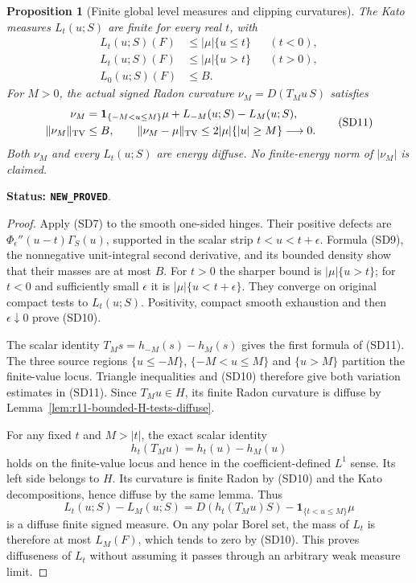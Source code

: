 \documentclass[11pt,a4paper]{article}
\numberwithin{equation}{section}
\newtheorem{proposition}[theorem]{Proposition}
\theoremstyle{definition}
\theoremstyle{remark}
\begin{document}
\begin{proposition}[Finite global level measures and clipping curvatures]
\label{prop:r11-signed-global-curvature-truncation}
The Kato measures $L_t(u;S)$ are finite for every real $t$,
with
\[
 \begin{aligned}
 L_t(u;S)(F)&\le |\mu|\{u\le t\}&& (t<0),\\
 L_t(u;S)(F)&\le |\mu|\{u>t\}&& (t>0),\\
 L_0(u;S)(F)&\le B.
 \end{aligned}
 \tag{SD10}
\]
For $M>0$, the actual signed Radon curvature
$\nu_M=D(T_Mu\,S)$ satisfies
\[
 \begin{split}
 \nu_M&=\mathbf1_{\{-M<u\le M\}}\mu+L_{-M}(u;S)-L_M(u;S),\\
 \|\nu_M\|_{\rm TV}&\le B,\qquad
 \|\nu_M-\mu\|_{\rm TV}
                    \le2|\mu|\{|u|\ge M\}\longrightarrow0.
 \end{split}
 \tag{SD11}
\]
Both $\nu_M$ and every $L_t(u;S)$ are energy diffuse.
No finite-energy norm of $|\nu_M|$ is claimed.
\end{proposition}

\noindent\textbf{Status: \texttt{NEW\_PROVED}}.

\begin{proof}
Apply (SD7) to the smooth one-sided hinges.  Their positive
defects are
$\Phi_\epsilon''(u-t)\Gamma_S(u)$, supported in the scalar
strip $t<u<t+\epsilon$.  Formula (SD9), the nonnegative
unit-integral second derivative, and its bounded density
show that their masses are at most $B$.
For $t>0$ the sharper bound is $|\mu|\{u>t\}$; for
$t<0$ and sufficiently small $\epsilon$ it is
$|\mu|\{u<t+\epsilon\}$.
They converge on original compact tests to $L_t(u;S)$.
Positivity, compact smooth exhaustion and then
$\epsilon\downarrow0$ prove (SD10).

The scalar identity $T_Ms=h_{-M}(s)-h_M(s)$ gives the
first formula of (SD11).  The three source regions
$\{u\le-M\}$, $\{-M<u\le M\}$ and $\{u>M\}$
partition the finite-value locus.  Triangle inequalities
and (SD10) therefore give both variation estimates in
(SD11).  Since $T_Mu\in H$, its finite Radon curvature
is diffuse by Lemma~\ref{lem:r11-bounded-H-tests-diffuse}.

For any fixed $t$ and $M>|t|$, the exact scalar identity
\[
                    h_t(T_Mu)=h_t(u)-h_M(u)
 \tag{SD12}
\]
holds on the finite-value locus and hence in the coefficient-defined
$L^1$ sense.  Its left side belongs to $H$.  Its curvature is finite Radon
by (SD10) and the Kato decompositions, hence diffuse by
the same lemma.  Thus
\[
 L_t(u;S)-L_M(u;S)
       =D(h_t(T_Mu)S)-\mathbf1_{\{t<u\le M\}}\mu
\]
is a diffuse finite signed measure.  On any polar Borel
set, the mass of $L_t$ is therefore at most $L_M(F)$,
which tends to zero by (SD10).  This proves diffuseness
of $L_t$ without assuming it passes through an arbitrary
weak measure limit.
\end{proof}
\end{document}

